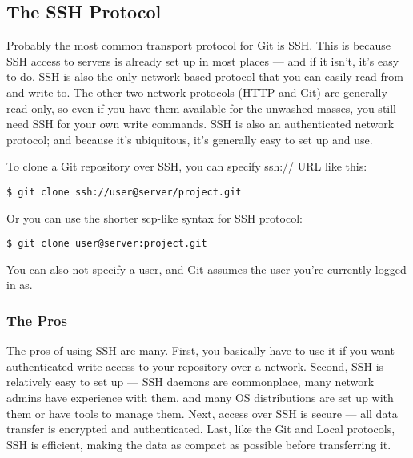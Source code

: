 \documentclass[a4paper]{book}
\begin{document}
\subsection{The SSH Protocol}\label{the-ssh-protocol}

Probably the most common transport protocol for Git is SSH. This is because SSH access to servers is already set up in most places --- and if it isn't, it's easy to do. SSH is also the only network-based protocol that you can easily read from and write to. The other two network protocols (HTTP and Git) are generally read-only, so even if you have them available for the unwashed masses, you still need SSH for your own write commands. SSH is also an authenticated network protocol; and because it's ubiquitous, it's generally easy to set up and use.

To clone a Git repository over SSH, you can specify ssh:// URL like this:

\begin{shaded}\begin{verbatim}
$ git clone ssh://user@server/project.git
\end{verbatim}\end{shaded}

Or you can use the shorter scp-like syntax for SSH protocol:

\begin{shaded}\begin{verbatim}
$ git clone user@server:project.git
\end{verbatim}\end{shaded}

You can also not specify a user, and Git assumes the user you're currently logged in as.

\subsubsection{The Pros}

The pros of using SSH are many. First, you basically have to use it if you want authenticated write access to your repository over a network. Second, SSH is relatively easy to set up --- SSH daemons are commonplace, many network admins have experience with them, and many OS distributions are set up with them or have tools to manage them. Next, access over SSH is secure --- all data transfer is encrypted and authenticated. Last, like the Git and Local protocols, SSH is efficient, making the data as compact as possible before transferring it.
\end{document}
